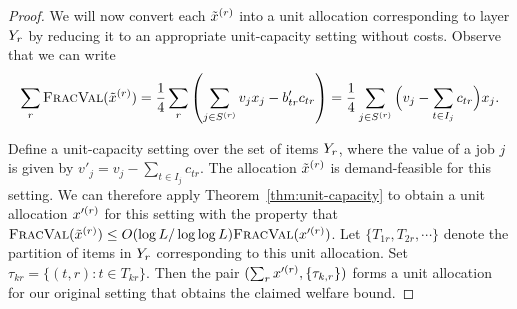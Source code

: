 \begin{proof}
    We will now convert each ${\tilde{x}^{(r)}}$ into a unit allocation
    corresponding to layer $Y_{r}$ by reducing it to an appropriate
    unit-capacity setting without costs. Observe that we can write
    \[\sum_r {\normalfont\textsc{FracVal}}({\tilde{x}^{(r)}}) = \frac 14\sum_r \left(\sum_{j\in S^{(r)}} v_jx_j - b'_{tr}c_{tr}\right) = \frac{1}{4}\sum_{j\in S^{(r)}} \Big(v_j-\sum_{t\in I_j}c_{tr}\Big)x_j.\]

    Define a unit-capacity setting over the set of items $Y_{r}$,
    where the value of a job $j$ is given by
    $v'_j=v_j-\sum_{t\in I_j}c_{tr}$. The allocation ${\tilde{x}^{(r)}}$ is
    demand-feasible for this setting. We can therefore apply
    Theorem~\ref{thm:unit-capacity} to obtain a unit allocation ${x'^{(r)}}$
    for this setting with the property that
    ${\normalfont\textsc{FracVal}}({\tilde{x}^{(r)}})\le O(\log L/\log\log L) {\normalfont\textsc{FracVal}}({x'^{(r)}})$. Let
    $\{T_{1r}, T_{2r}, \cdots\}$ denote the partition of items in
    $Y_{r}$ corresponding to this unit allocation. Set
    $\tau_{kr} = \{(t,r): t\in T_{kr}\}$. Then the pair
    $(\sum_r {x'^{(r)}},\{\tau_{k,r}\})$ forms a unit allocation for our
    original setting that obtains the claimed welfare bound.
\end{proof}

